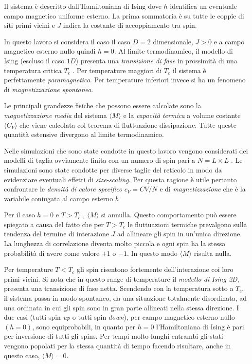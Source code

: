 \documentclass[a4paper,12pt]{article}
\begin{document}
Il sistema è descritto dall’Hamiltoniana di Ising
dove $h$ identifica un eventuale campo magnetico uniforme esterno. La prima sommatoria è  su tutte le coppie di siti primi vicini e $J$ indica la costante di accoppiamento tra spin. 

In questo lavoro si considera il caso il caso $D = 2$ dimensionale, $J > 0$ e a campo magnetico esterno nullo quindi $h = 0$. Al limite termodinamico, il modello di Ising (escluso il caso $1D$) presenta una \emph{transizione di fase} in prossimità di una temperatura critica $T_c$ . Per temperature maggiori di $T_c$ il sistema \`e perfettamente \emph{paramagnetico}. Per temperature inferiori invece si ha un fenomeno di \emph{magnetizzazione spontanea}. 

Le principali grandezze fisiche che possono essere calcolate sono la \emph{magnetizzazione media} del sistema $\langle M\rangle$  e la \emph{capacità termica} a volume costante $\langle C_V \rangle$ che viene calcolata col teorema di fluttuazione-dissipazione. Tutte queste quantit\`a estensive divergono al limite termodinamico. 

Nelle simulazioni che sono state condotte in questo lavoro vengono considerati dei modelli di taglia ovviamente finita con un numero di spin pari a $N = L \times L$ . Le simulazioni sono state condotte per diverse taglie del reticolo in modo da evidenziare eventuali effetti di \emph{size-scaling}. Per questa ragione \`e utile pertanto confrontare le \emph{densità di calore specifico} $c_V = CV /N$ e di \emph{magnetizzazione} che è la variabile coniugata al campo esterno $h$

Per il caso $h = 0$ e $T > T_c$ , $\langle M \rangle$ si annulla. Questo comportamento può essere spiegato a causa del fatto che per $T > T_c$ le fluttuazioni termiche prevalgono sulla tendenza del termine di interazione $J$ ad allineare gli spin in un'unica direzione. La lunghezza di correlazione diventa molto piccola e ogni spin ha la stessa probabilità di avere come valore $+1$ o $-1$. In questo modo $\langle M \rangle$ risulta nulla. 

Per temperature $T < T_c$ gli spin risentono fortemente dell’interazione coi loro primi vicini. Si nota che in questo range di temperature il \emph{modello di Ising 2D}, presenta una transizione di fase netta. Scendendo con la temperatura sotto a $T_c$, il sistema passa in modo spontaneo, da una situazione totalmente disordinata, ad una ordinata in cui gli spin sono in gran parte allineati nella stessa direzione. I due casi (tutti spin \emph{up} o tutti spin \emph{down}), per campo magnetico esterno nullo $(h = 0)$, sono equiprobabili, in quanto per $h = 0$ l’Hamiltoniana di Ising è pari per inversione di tutti gli spins. Per tempi molto lunghi entrambi gli stati vengono popolati per la stessa quantità di tempo facendo risultare, anche in questo caso, $\langle M \rangle = 0$. 
\end{document}
